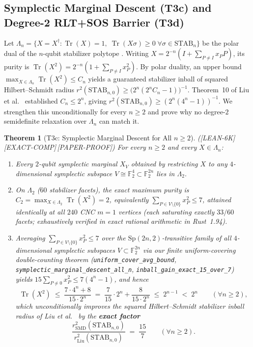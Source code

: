 \documentclass[11pt,reqno]{amsart}
\newtheorem{theorem}{Theorem}[section]
\theoremstyle{definition}
\newcommand{\FF}{\mathbb{F}}
\newcommand{\Tr}{\operatorname{Tr}}
\newcommand{\STAB}{\mathrm{STAB}}
\newcommand{\Sp}{\mathrm{Sp}}
\newcommand{\lid}[1]{{\footnotesize\nolinkurl{#1}}}
\newcommand{\tagL}{\textsf{\footnotesize[LEAN-6K]}}
\newcommand{\tagE}{\textsf{\footnotesize[EXACT-COMP]}}
\newcommand{\tagP}{\textsf{\footnotesize[PAPER-PROOF]}}
\begin{document}
\subsection{Symplectic Marginal Descent (T3c) and Degree-2 RLT+SOS Barrier (T3d)}

Let $\Lambda_n = \{X = X^\dagger : \Tr(X) = 1,\; \Tr(X \sigma) \ge 0\;\forall \sigma \in
\STAB_n\}$ be the polar dual of the $n$-qubit stabilizer polytope \cite{zurel2020hvm,
liu2025triangle}. Writing $X = 2^{-n}(I + \sum_{P \ne I} x_P P)$, its purity is
$\Tr(X^2) = 2^{-n}(1 + \sum_{P \ne I} x_P^2)$. By polar duality, an upper bound
$\max_{X \in \Lambda_n} \Tr(X^2) \le C_n$ yields a guaranteed stabilizer inball of squared
Hilbert--Schmidt radius $r^2(\STAB_{n,0}) \ge \big(2^n(2^n C_n - 1)\big)^{-1}$. Theorem~10
of Liu et al.\ \cite{liu2025triangle} established $C_n \le 2^n$, giving $r^2(\STAB_{n,0})
\ge (2^n(4^n-1))^{-1}$. We strengthen this unconditionally for every $n \ge 2$ and prove
why no degree-$2$ semidefinite relaxation over $\Lambda_n$ can match it.

\begin{theorem}[T3c: Symplectic Marginal Descent for All $n \ge 2$]
\label{thm:t3c}
\textup{(\tagL\,\tagE\,\tagP)}
For every $n \ge 2$ and every $X \in \Lambda_n$:
\begin{enumerate}[label=(\alph*)]
  \item Every $2$-qubit symplectic marginal $X_V$ obtained by restricting $X$ to any
    $4$-dimensional symplectic subspace $V \cong \FF_2^4 \subset \FF_2^{2n}$ lies in
    $\Lambda_2$.
  \item On $\Lambda_2$ ($60$ stabilizer facets), the exact maximum purity is
    $C_2 = \max_{X \in \Lambda_2} \Tr(X^2) = 2$, equivalently
    $\sum_{P \in V \setminus \{0\}} x_P^2 \le 7$, attained identically at all $240$ CNC
    $m=1$ vertices (each saturating exactly $33/60$ facets; exhaustively verified in
    exact rational arithmetic in Rust~1.94).
  \item Averaging $\sum_{P \in V \setminus \{0\}} x_P^2 \le 7$ over the
    $\Sp(2n, 2)$-transitive family of all $4$-dimensional symplectic subspaces $V \subset
    \FF_2^{2n}$ via our finite uniform-covering double-counting theorem
    (\lid{uniform_cover_avg_bound}, \lid{symplectic_marginal_descent_all_n},
    \lid{inball_gain_exact_15_over_7}) yields $15 \sum_{P \ne 0} x_P^2 \le 7(4^n - 1)$,
    and hence
    \begin{equation}
      \label{eq:smd-bound}
      \Tr(X^2) \;\le\; \frac{7 \cdot 4^n + 8}{15 \cdot 2^n}
      \;=\; \frac{7}{15}\cdot 2^n + \frac{8}{15 \cdot 2^n}
      \;\le\; 2^{n-1} \;<\; 2^n \qquad (\forall n \ge 2),
    \end{equation}
    which unconditionally improves the squared Hilbert--Schmidt stabilizer inball radius
    of Liu et al.\ \cite[Theorem~10]{liu2025triangle} by the \textbf{exact factor}
    \[
      \frac{r^2_{\mathrm{SMD}}(\STAB_{n,0})}{r^2_{\mathrm{Liu}}(\STAB_{n,0})}
      \;=\; \frac{15}{7} \qquad (\forall n \ge 2).
    \]
\end{enumerate}
\end{theorem}
\end{document}
